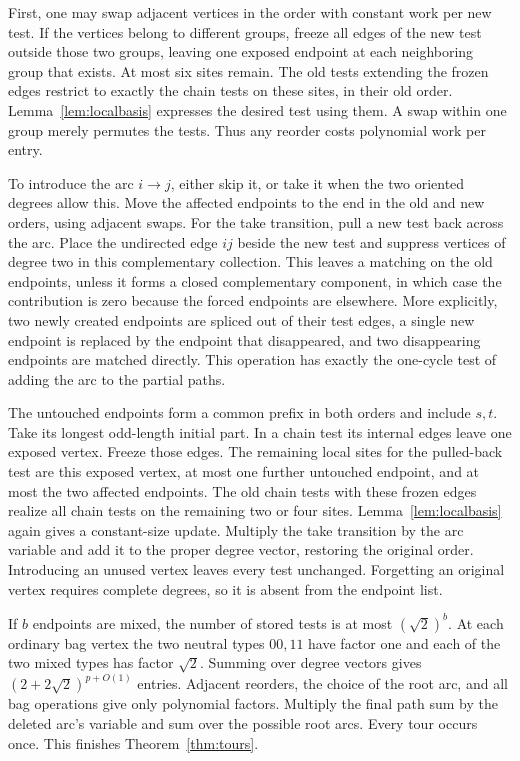 \documentclass[11pt]{article}
\theoremstyle{definition}
\begin{document}
First, one may swap adjacent vertices in the order with constant work per new test. If the vertices belong to different groups, freeze all edges of the new test outside those two groups, leaving one exposed endpoint at each neighboring group that exists. At most six sites remain. The old tests extending the frozen edges restrict to exactly the chain tests on these sites, in their old order. Lemma~\ref{lem:localbasis} expresses the desired test using them. A swap within one group merely permutes the tests. Thus any reorder costs polynomial work per entry.

To introduce the arc \(i\to j\), either skip it, or take it when the two oriented degrees allow this. Move the affected endpoints to the end in the old and new orders, using adjacent swaps. For the take transition, pull a new test back across the arc. Place the undirected edge \(ij\) beside the new test and suppress vertices of degree two in this complementary collection. This leaves a matching on the old endpoints, unless it forms a closed complementary component, in which case the contribution is zero because the forced endpoints are elsewhere. More explicitly, two newly created endpoints are spliced out of their test edges, a single new endpoint is replaced by the endpoint that disappeared, and two disappearing endpoints are matched directly. This operation has exactly the one-cycle test of adding the arc to the partial paths.

The untouched endpoints form a common prefix in both orders and include \(s,t\). Take its longest odd-length initial part. In a chain test its internal edges leave one exposed vertex. Freeze those edges. The remaining local sites for the pulled-back test are this exposed vertex, at most one further untouched endpoint, and at most the two affected endpoints. The old chain tests with these frozen edges realize all chain tests on the remaining two or four sites. Lemma~\ref{lem:localbasis} again gives a constant-size update. Multiply the take transition by the arc variable and add it to the proper degree vector, restoring the original order. Introducing an unused vertex leaves every test unchanged. Forgetting an original vertex requires complete degrees, so it is absent from the endpoint list.

If \(b\) endpoints are mixed, the number of stored tests is at most \((\sqrt2)^b\). At each ordinary bag vertex the two neutral types \(00,11\) have factor one and each of the two mixed types has factor \(\sqrt2\). Summing over degree vectors gives \((2+2\sqrt2)^{p+O(1)}\) entries. Adjacent reorders, the choice of the root arc, and all bag operations give only polynomial factors. Multiply the final path sum by the deleted arc's variable and sum over the possible root arcs. Every tour occurs once. This finishes Theorem~\ref{thm:tours}.
\end{document}
